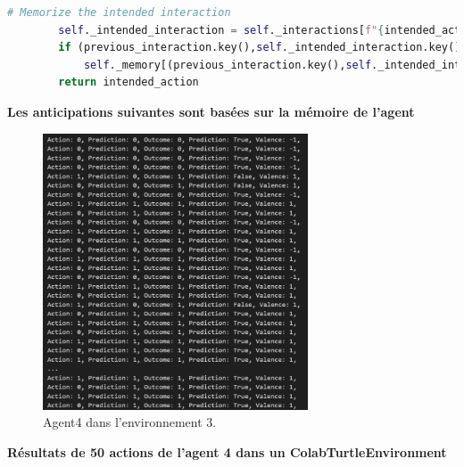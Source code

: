 \documentclass[a4paper, 12pt]{article}
\begin{document}
\begin{lstlisting}[language=Python]
        # Memorize the intended interaction
        self._intended_interaction = self._interactions[f"{intended_action}{intended_outcome}"]
        if (previous_interaction.key(),self._intended_interaction.key()) not in self._memory:
            self._memory[(previous_interaction.key(),self._intended_interaction.key())] = None
        return intended_action
\end{lstlisting}

\newpage

\noindent \large \textbf{Les anticipations suivantes sont basées sur la mémoire de l'agent}
\normalsize

\begin{figure}[h]
    \centering
    \includegraphics[width=0.7\textwidth]{ReportImages/Agent4/Agent4_Env3.png}
    \caption{Agent4 dans l'environnement 3.}
    \label{fig:agent4_env3}
\end{figure}

\newpage

\noindent \large \textbf{Résultats de 50 actions de l'agent 4 dans un ColabTurtleEnvironment}
\normalsize
\end{document}

